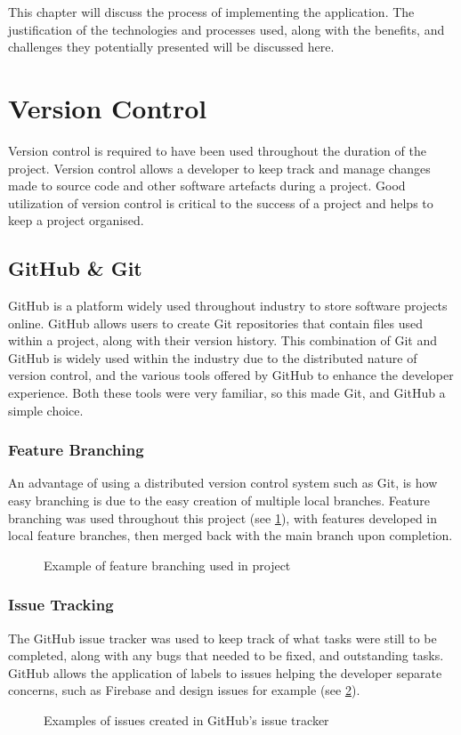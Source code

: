 This chapter will discuss the process of implementing the application. The justification of the technologies and processes used, along with the benefits, and challenges they potentially presented will be discussed here.

\section{Version Control}
Version control is required to have been used throughout the duration of the project. Version control allows a developer to keep track and manage changes made to source code and other software artefacts during a project. Good utilization of version control is critical to the success of a project and helps to keep a project organised.
\subsection{GitHub \& Git}
GitHub \cite{github} is a platform widely used throughout industry to store software projects online. GitHub allows users to create Git repositories \cite{git} that contain files used within a project, along with their version history. This combination of Git and GitHub is widely used within the industry due to the distributed nature of version control, and the various tools offered by GitHub to enhance the developer experience. Both these tools were very familiar, so this made Git, and GitHub a simple choice. 
\subsubsection{Feature Branching}
An advantage of using a distributed version control system such as Git, is how easy branching is due to the easy creation of multiple local branches. Feature branching was used throughout this project (see \ref{fig:branching}), with features developed in local feature branches, then merged back with the main branch upon completion.  
\begin{figure}[!htbp]
    \centering
    \begin{subfigure}[b]{0.90\textwidth}
    \end{subfigure}
    \caption{Example of feature branching used in project}
    \label{fig:branching}
\end{figure}
\subsubsection{Issue Tracking}
The GitHub issue tracker was used to keep track of what tasks were still to be completed, along with any bugs that needed to be fixed, and outstanding tasks. GitHub allows the application of labels to issues helping the developer separate concerns, such as Firebase and design issues for example (see \ref{fig:issues}).
\begin{figure}[!htbp]
    \centering
    \begin{subfigure}[b]{0.90\textwidth}
    \end{subfigure}
    \caption{Examples of issues created in GitHub's issue tracker}
    \label{fig:issues}
\end{figure}
